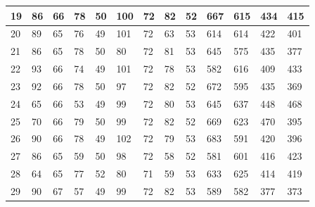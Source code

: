 \documentclass[legalpaper,12pt]{article}
\begin{document}
\begin{table}[htbp]
\begin{tabular}{|l|l|l|l|l|l|l|l|l|l|l|l|l|}
19                                        & 86         & 66        & 78          & 50         & 100        & 72        & 82          & 52         & 667        & 615       & 434         & 415        \\ \hline
20                                        & 89         & 65        & 76          & 49         & 101        & 72        & 63          & 53         & 614        & 614       & 422         & 401        \\ \hline
21                                        & 86         & 65        & 78          & 50         & 80         & 72        & 81          & 53         & 645        & 575       & 435         & 377        \\ \hline
22                                        & 93         & 66        & 74          & 49         & 101        & 72        & 78          & 53         & 582        & 616       & 409         & 433        \\ \hline
23                                        & 92         & 66        & 78          & 50         & 97         & 72        & 82          & 52         & 672        & 595       & 435         & 369        \\ \hline
24                                        & 65         & 66        & 53          & 49         & 99         & 72        & 80          & 53         & 645        & 637       & 448         & 468        \\ \hline
25                                        & 70         & 66        & 79          & 50         & 99         & 72        & 82          & 52         & 669        & 623       & 470         & 395        \\ \hline
26                                        & 90         & 66        & 78          & 49         & 102        & 72        & 79          & 53         & 683        & 591       & 420         & 396        \\ \hline
27                                        & 86         & 65        & 59          & 50         & 98         & 72        & 58          & 52         & 581        & 601       & 416         & 423        \\ \hline
28                                        & 64         & 65        & 77          & 52         & 80         & 71        & 59          & 53         & 633        & 625       & 414         & 419        \\ \hline
29                                        & 90         & 67        & 57          & 49         & 99         & 72        & 82          & 53         & 589        & 582       & 377         & 373        \\ \hline

\end{tabular}
\end{table}
\end{document}
